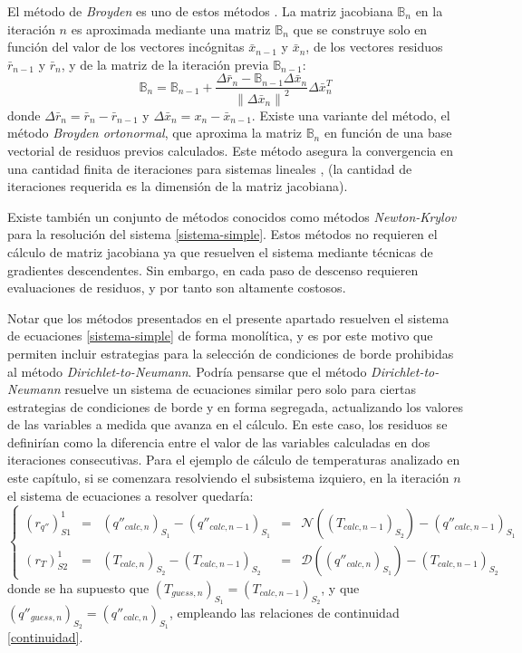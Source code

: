 El método de \textit{Broyden} es uno de estos métodos \cite{broyden}.
La matriz jacobiana $\mathbb{B}_n$ en la iteración $n$ es aproximada mediante una matriz $\mathbb{B}_n$ que se construye solo en función 
del valor de los vectores incógnitas $\bar{x}_{n-1}$ y $\bar{x}_{n}$,
de los vectores residuos $\bar{r}_{n-1}$ y $\bar{r}_{n}$,
y de la matriz de la iteración previa $\mathbb{B}_{n-1}$:
\begin{equation}
\mathbb{B}_n = \mathbb{B}_{n-1} + \frac{\Delta{\bar{r}_n}-\mathbb{B}_{n-1}\Delta{\bar{x}_n}}{\left \| \Delta{\bar{x}_n} \right \| ^2}\Delta{\bar{x}}_n^T
\label{broyden}
\end{equation}
donde $\Delta{\bar{r}_n}=\bar{r}_n - \bar{r}_{n-1}$ y $\Delta{\bar{x}_n}=x_n - \bar{x}_{n-1}$.
Existe una variante del método, el método \textit{Broyden ortonormal}, que aproxima la matriz $\mathbb{B}_n$ en función de una base vectorial de residuos previos calculados.
Este método asegura la convergencia en una cantidad finita de iteraciones para sistemas lineales \cite{broyden-on}, (la cantidad de iteraciones requerida es la dimensión de la matriz jacobiana).

Existe también un conjunto de métodos conocidos como métodos \textit{Newton-Krylov} \cite{kelley} para la resolución del sistema \ref{sistema-simple}.
Estos métodos no requieren el cálculo de matriz jacobiana ya que resuelven el sistema mediante técnicas de gradientes descendentes.
Sin embargo, en cada paso de descenso requieren evaluaciones de residuos, y por tanto son altamente costosos.

Notar que los métodos presentados en el presente apartado resuelven el sistema de ecuaciones \ref{sistema-simple} de forma monolítica,
y es por este motivo que permiten incluir estrategias para la selección de condiciones de borde prohibidas al método \textit{Dirichlet-to-Neumann}.
Podría pensarse que el método \textit{Dirichlet-to-Neumann} resuelve un sistema de ecuaciones similar pero solo para ciertas estrategias de condiciones de borde y en forma segregada,
actualizando los valores de las variables a medida que avanza en el cálculo.
En este caso, los residuos se definirían como la diferencia entre el valor de las variables calculadas en dos iteraciones consecutivas.
Para el ejemplo de cálculo de temperaturas analizado en este capítulo, si se comenzara resolviendo el subsistema izquiero, en la iteración $n$ el sistema de ecuaciones a resolver quedaría:
\begin{equation}
\left\{ \begin{array}{rcccl}
(r_{q''})_{S1}^{1} &=& (q''_{calc,n})_{S_1} - (q''_{calc,n-1})_{S_1} &=&\mathscr{N}\left(\left(T_{calc,n-1}\right )_{S_2}\right) - (q''_{calc,n-1})_{S_1} \\
(r_{T})_{S2}^{1} &=& (T_{calc,n})_{S_2} - (T_{calc,n-1})_{S_2} &=& \mathscr{D}\left(\left(q''_{calc,n}\right )_{S_1} \right ) - (T_{calc,n-1})_{S_2}
\end{array}\right.
\label{res_qt}
\end{equation}
donde se ha supuesto que $\left(T_{guess,n}\right )_{S_1}=\left(T_{calc,n-1}\right )_{S_2}$,
y que $\left(q''_{guess,n}\right )_{S_2}=\left(q''_{calc,n}\right )_{S_1}$,
empleando las relaciones de continuidad \ref{continuidad}.

